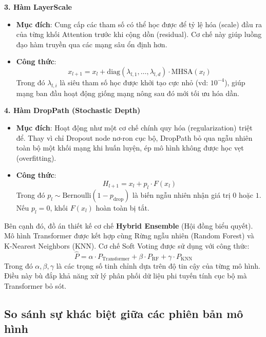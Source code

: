 \documentclass[../DoAn.tex]{subfiles}
\begin{document}
\textbf{3. Hàm LayerScale}
\begin{itemize}
    \item \textbf{Mục đích}: Cung cấp các tham số có thể học được để tỷ lệ hóa (scale) đầu ra của từng khối Attention trước khi cộng dồn (residual). Cơ chế này giúp luồng đạo hàm truyền qua các mạng sâu ổn định hơn.
    \item \textbf{Công thức}:
    \begin{equation}
        x_{l+1} = x_l + \text{diag}(\lambda_{l,1}, \dots, \lambda_{l,d}) \cdot \text{MHSA}(x_l)
    \end{equation}
    Trong đó $\lambda_{l,i}$ là siêu tham số học được khởi tạo cực nhỏ (vd: $10^{-4}$), giúp mạng ban đầu hoạt động giống mạng nông sau đó mới tối ưu hóa dần.
\end{itemize}

\textbf{4. Hàm DropPath (Stochastic Depth)}
\begin{itemize}
    \item \textbf{Mục đích}: Hoạt động như một cơ chế chính quy hóa (regularization) triệt để. Thay vì chỉ Dropout node nơ-ron cục bộ, DropPath bỏ qua ngẫu nhiên toàn bộ một khối mạng khi huấn luyện, ép mô hình không được học vẹt (overfitting).
    \item \textbf{Công thức}:
    \begin{equation}
        H_{l+1} = x_l + p_l \cdot F(x_l)
    \end{equation}
    Trong đó $p_l \sim \text{Bernoulli}(1 - p_{\text{drop}})$ là biến ngẫu nhiên nhận giá trị $0$ hoặc $1$. Nếu $p_l = 0$, khối $F(x_l)$ hoàn toàn bị tắt.
\end{itemize}

Bên cạnh đó, đồ án thiết kế cơ chế \textbf{Hybrid Ensemble} (Hội đồng biểu quyết). Mô hình Transformer được kết hợp cùng Rừng ngẫu nhiên (Random Forest) và K-Nearest Neighbors (KNN). Cơ chế Soft Voting được sử dụng với công thức:
\begin{equation}
    \hat{P} = \alpha \cdot P_{\text{Transformer}} + \beta \cdot P_{\text{RF}} + \gamma \cdot P_{\text{KNN}}
\end{equation}
Trong đó $\alpha, \beta, \gamma$ là các trọng số tinh chỉnh dựa trên độ tin cậy của từng mô hình. Điều này bù đắp khả năng xử lý phân phối dữ liệu phi tuyến tính cục bộ mà Transformer bỏ sót.

\subsection{So sánh sự khác biệt giữa các phiên bản mô hình}
\end{document}
